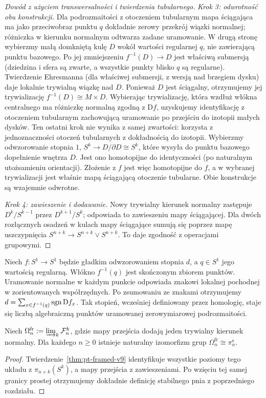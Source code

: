 \begin{proof}[Dowód z użyciem transwersalności i twierdzenia tubularnego]
\emph{Krok 3: odwrotność obu konstrukcji.}
Dla podrozmaitości z otoczeniem tubularnym mapa
ściągająca ma jako przeciwobraz punktu $q$ dokładnie
zerowy przekrój wiązki normalnej; różniczka w kierunku
normalnym odtwarza zadane uramowanie. W drugą stronę
wybierzmy małą domkniętą kulę $D$ wokół wartości
regularnej $q$, nie zawierającą punktu bazowego.
Po jej zmniejszeniu $f^{-1}(D)\to D$ jest właściwą
submersją (dziedzina i sfera są zwarte, a wszystkie
punkty blisko $q$ są regularne). Twierdzenie Ehresmanna (dla właściwej submersji,
z wersją nad brzegiem dysku) daje lokalnie trywialną
wiązkę nad $D$. Ponieważ $D$ jest ściągalny,
otrzymujemy jej trywializację $f^{-1}(D)\cong M\times D$.
Wybierając trywializację, która wzdłuż włókna centralnego
ma różniczkę normalną zgodną z $\mathrm{D}f$, uzyskujemy
identyfikację z otoczeniem tubularnym zachowującą
uramowanie po przejściu do izotopii małych dysków.
Ten ostatni krok nie wynika z samej zwartości: korzysta
z jednoznaczności otoczeń tubularnych z dokładnością
do izotopii.
Wybierzmy odwzorowanie stopnia $1$,
$S^k\to D/\partial D\cong S^k$, które wysyła
do punktu bazowego dopełnienie wnętrza $D$.
Jest ono homotopijne do identyczności (po naturalnym
utożsamieniu orientacji). Złożenie z $f$ jest więc
homotopijne do $f$, a w wybranej trywializacji
jest właśnie mapą ściągającą otoczenie tubularne.
Obie konstrukcje są wzajemnie odwrotne.

\emph{Krok 4: zawieszenie i dodawanie.}
Nowy trywialny kierunek normalny zastępuje
$D^k/S^{k-1}$ przez $D^{k+1}/S^k$;
odpowiada to zawieszeniu mapy ściągającej.
Dla dwóch rozłącznych osadzeń w kulach mapy
ściągające sumują się poprzez mapę uszczypnięcia
$S^{n+k}\to S^{n+k}\vee S^{n+k}$. To daje
zgodność z operacjami grupowymi.
\end{proof}

\begin{przyklad}
Niech $f:S^1\to S^1$ będzie gładkim odwzorowaniem
stopnia $d$, a $q\in S^1$ jego wartością regularną.
Włókno $f^{-1}(q)$ jest skończonym zbiorem punktów.
Uramowanie normalne w każdym punkcie odpowiada znakowi
lokalnej pochodnej w zorientowanych współrzędnych.
Po zsumowaniu ze znakami otrzymujemy
$d=\sum_{x\in f^{-1}(q)}\operatorname{sgn}\mathrm D f_x$.
Tak stopień, wcześniej definiowany przez homologię,
staje się liczbą algebraiczną punktów uramowanej
zerowymiarowej podrozmaitości.
\end{przyklad}

\begin{wniosek}
\label{cor:pt-stable-v9}
Niech $\Omega_n^{\mathrm{fr}}:=\varinjlim_k\mathcal F_n^k$,
gdzie mapy przejścia dodają jeden trywialny kierunek
normalny. Dla każdego $n\ge0$ istnieje naturalny
izomorfizm grup
$\Omega_n^{\mathrm{fr}}\cong\pi_n^{\mathrm s}$.
\end{wniosek}
\begin{proof}
Twierdzenie~\ref{thm:pt-framed-v9} identyfikuje wszystkie
poziomy tego układu z $\pi_{n+k}(S^k)$,
a mapy przejścia z zawieszeniami. Po wzięciu
tej samej granicy prostej otrzymujemy dokładnie
definicję stabilnego pnia z poprzedniego rozdziału.
\end{proof}

